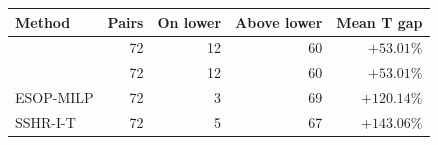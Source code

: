 \begin{tabular}{lrrrr}
\toprule
Method & Pairs & On lower & Above lower & Mean T gap \\
\midrule
\method{} & 72 & 12 & 60 & $+53.01\%$ \\
\paretomethod{} & 72 & 12 & 60 & $+53.01\%$ \\
ESOP-MILP & 72 & 3 & 69 & $+120.14\%$ \\
SSHR-I-T & 72 & 5 & 67 & $+143.06\%$ \\
\bottomrule
\end{tabular}
